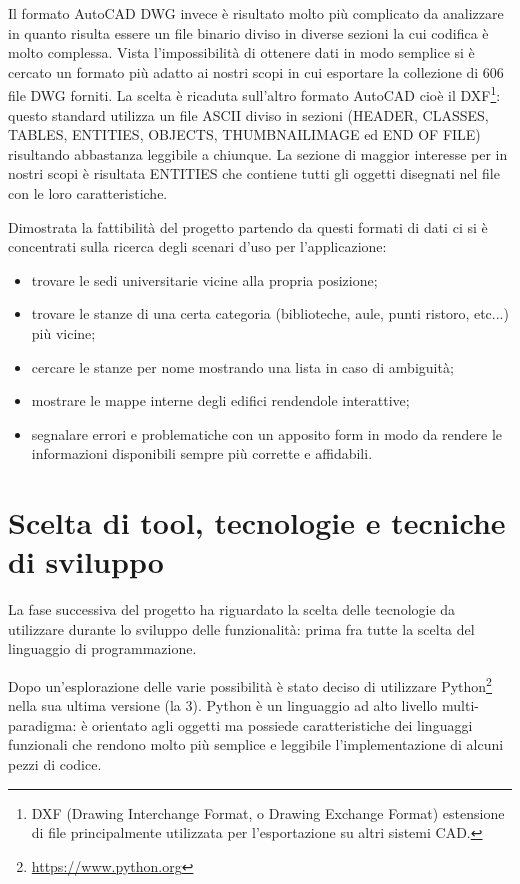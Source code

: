 \documentclass[12pt]{report}
\begin{document}
Il formato AutoCAD DWG invece è risultato molto più complicato da analizzare in quanto risulta essere un file binario diviso in diverse sezioni la cui codifica è molto complessa. Vista l'impossibilità di ottenere dati in modo semplice si è cercato un formato più adatto ai nostri scopi in cui esportare la collezione di 606 file DWG forniti. La scelta è ricaduta sull'altro formato AutoCAD cioè il DXF\footnote{DXF (Drawing Interchange Format, o Drawing Exchange Format) estensione di file principalmente utilizzata per l'esportazione su altri sistemi CAD.}: questo standard utilizza un file ASCII diviso in sezioni (HEADER, CLASSES, TABLES, ENTITIES, OBJECTS, THUMBNAILIMAGE ed END OF FILE) risultando abbastanza leggibile a chiunque. La sezione di maggior interesse per in nostri scopi è risultata ENTITIES che contiene tutti gli oggetti disegnati nel file con le loro caratteristiche.

\vspace{5mm} %

Dimostrata la fattibilità del progetto partendo da questi formati di dati ci si è concentrati sulla ricerca degli scenari d'uso per l'applicazione:        
\begin{itemize}
\item trovare le sedi universitarie vicine alla propria posizione;
\item trovare le stanze di una certa categoria (biblioteche, aule, punti ristoro, etc...) più vicine;
\item cercare le stanze per nome mostrando una lista in caso di ambiguità;
\item mostrare le mappe interne degli edifici rendendole interattive;
\item segnalare errori e problematiche con un apposito form in modo da rendere le informazioni disponibili sempre più corrette e affidabili.
\end{itemize}


\newpage
\section{Scelta di tool, tecnologie e tecniche di sviluppo}

La fase successiva del progetto ha riguardato la scelta delle tecnologie da utilizzare durante lo sviluppo delle funzionalità: prima fra tutte la scelta del linguaggio di programmazione.

Dopo un'esplorazione delle varie possibilità è stato deciso di utilizzare Python\footnote{\url{https://www.python.org}} nella sua ultima versione (la 3). Python è un linguaggio ad alto livello multi-paradigma: è orientato agli oggetti ma possiede caratteristiche dei linguaggi funzionali che rendono molto più semplice e leggibile l'implementazione di alcuni pezzi di codice.
\end{document}
